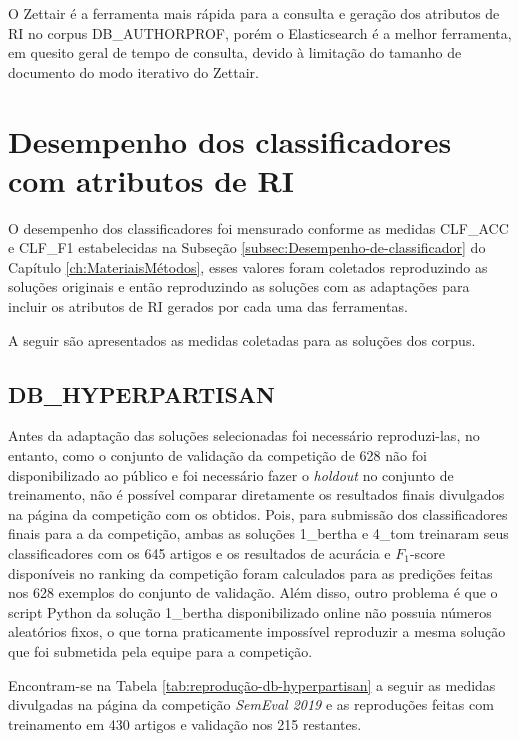 			O Zettair é a ferramenta mais rápida para a consulta e geração dos atributos de RI no corpus DB\_AUTHORPROF, porém o Elasticsearch é a melhor ferramenta, em quesito geral de tempo de consulta, devido à limitação do tamanho de documento do modo iterativo do Zettair.

	\section{Desempenho dos classificadores com atributos de RI} \label{sec:DesempenhoClassificadores}
		O desempenho dos classificadores foi mensurado conforme as medidas CLF\_ACC e CLF\_F1 estabelecidas na Subseção \ref{subsec:Desempenho-de-classificador} do Capítulo \ref{ch:MateriaisMétodos}, esses valores foram coletados reproduzindo as soluções originais e então reproduzindo as soluções com as adaptações para incluir os atributos de RI gerados por cada uma das ferramentas.

		A seguir são apresentados as medidas coletadas para as soluções dos corpus.

		\subsection{DB\_HYPERPARTISAN}
			Antes da adaptação das soluções selecionadas foi necessário reproduzi-las, no entanto, como o conjunto de validação da competição de 628 não foi disponibilizado ao público e foi necessário fazer o \textit{holdout} no conjunto de treinamento, não é possível comparar diretamente os resultados finais divulgados na página da competição com os obtidos.
			Pois, para submissão dos classificadores finais para a da competição, ambas as soluções 1\_bertha e 4\_tom treinaram seus classificadores com os 645 artigos e os resultados de acurácia e $F_1$-score disponíveis no ranking da competição foram calculados para as predições feitas nos 628 exemplos do conjunto de validação.
			Além disso, outro problema é que o script Python da solução 1\_bertha disponibilizado online não possuia números aleatórios fixos, o que torna praticamente impossível reproduzir a mesma solução que foi submetida pela equipe para a competição.

			Encontram-se na Tabela \ref{tab:reprodução-db-hyperpartisan} a seguir as medidas divulgadas na página da competição \textit{SemEval 2019} \cite{PAN_HNDLEADERBOARD_2019} e as reproduções feitas com treinamento em 430 artigos e validação nos 215 restantes.

			

